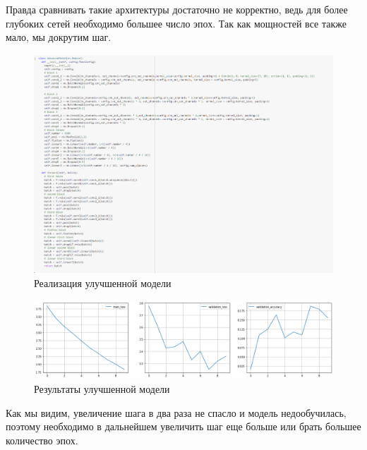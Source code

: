 \documentclass[a4paper,12pt]{article}
\begin{document}
		Правда сравнивать такие архитектуры достаточно не корректно, ведь для более глубоких сетей необходимо большее число эпох. Так как мощностей все также мало, мы докрутим шаг.
	\begin{figure}[H]
		\centering
		\includegraphics[width=1\linewidth]{Image/Advanced_model}
		\caption{Реализация улучшенной модели}
		\label{fig:advancedmodel}
	\end{figure}
	
	\begin{figure}[H]
	\centering
	\includegraphics[width=1.2\linewidth]{Image/Advanced_model_train.png}
	\caption{Результаты улучшенной модели}
	\label{fig:featurizer1}
	\end{figure}
	Как мы видим, увеличение шага в два раза не спасло и модель недообучилась, поэтому необходимо в дальнейшем увеличить шаг еще больше или брать большее количество эпох. 
\end{document}
